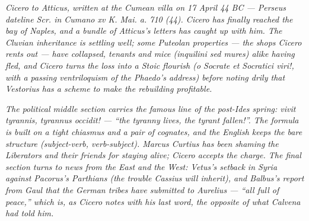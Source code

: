 
\textit{Cicero to Atticus, written at the Cumean villa on 17
April 44 BC --- Perseus dateline \textit{Scr. in Cumano xv K.
Mai. a. 710 (44)}. Cicero has finally reached the bay of Naples,
and a bundle of Atticus's letters has caught up with him.
The Cluvian inheritance is settling well; some Puteolan
properties --- the shops Cicero rents out --- have collapsed,
\textit{tenants and mice} (\textit{inquilini sed mures}) alike
having fled, and Cicero turns the loss into a Stoic flourish
(\textit{o Socrate et Socratici viri!}, with a passing
ventriloquism of the Phaedo's address) before noting drily that
Vestorius has a scheme to make the rebuilding profitable.}

\textit{The political middle section carries the famous line of
the post-Ides spring: \textit{vivit tyrannis, tyrannus
occidit!} --- ``the tyranny lives, the tyrant fallen!''. The
formula is built on a tight chiasmus and a pair of cognates, and
the English keeps the bare structure (subject-verb,
verb-subject). Marcus Curtius has been shaming the Liberators
and their friends for staying alive; Cicero accepts the charge.
The final section turns to news from the East and the West:
Vetus's setback in Syria against Pacorus's Parthians (the
trouble Cassius will inherit), and Balbus's report from Gaul
that the German tribes have submitted to Aurelius --- ``all full
of peace,'' which is, as Cicero notes with his last word, the
opposite of what Calvena had told him.}
